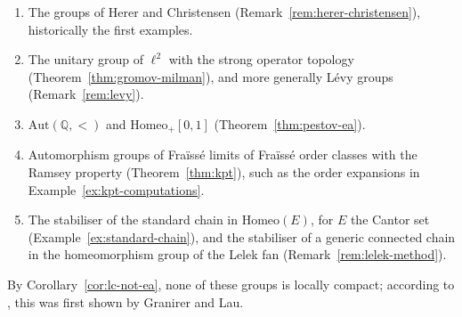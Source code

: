 \begin{remark}\label{rem:ea-summary}
\begin{enumerate}
\item The groups of Herer and Christensen (Remark~\ref{rem:herer-christensen}),
  historically the first examples.
\item The unitary group of $\ell^2$ with the strong operator topology
  (Theorem~\ref{thm:gromov-milman}), and more generally Lévy groups
  (Remark~\ref{rem:levy}).
\item $\mathrm{Aut}(\mathbb{Q},<)$ and $\mathrm{Homeo}_+[0,1]$
  (Theorem~\ref{thm:pestov-ea}).
\item Automorphism groups of Fraïssé limits of Fraïssé order classes with the
  Ramsey property (Theorem~\ref{thm:kpt}), such as the order expansions in
  Example~\ref{ex:kpt-computations}.
\item The stabiliser of the standard chain in $\mathrm{Homeo}(E)$, for $E$ the
  Cantor set (Example~\ref{ex:standard-chain}), and the stabiliser of a
  generic connected chain in the homeomorphism group of the Lelek fan
  (Remark~\ref{rem:lelek-method}).
\end{enumerate}
By Corollary~\ref{cor:lc-not-ea}, none of these groups is locally compact;
according to \cite{GiordanoPestov2007}, this was first shown by Granirer and
Lau.
\end{remark}
